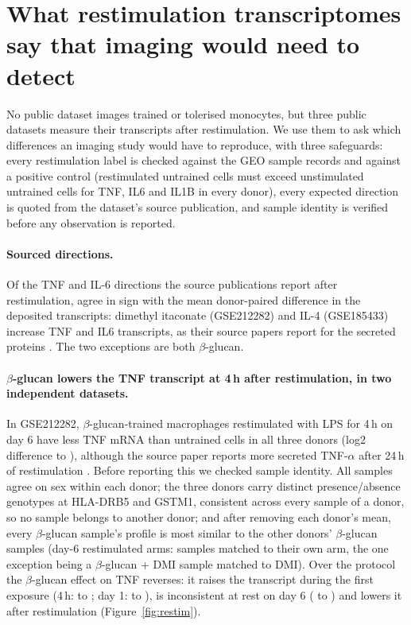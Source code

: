 \section{What restimulation transcriptomes say that imaging would need to detect}
\label{sec:partC}
No public dataset images trained or tolerised monocytes, but three public datasets measure
their transcripts after restimulation. We use them to ask which differences an imaging
study would have to reproduce, with three safeguards: every restimulation label is checked
against the GEO sample records and against a positive control (restimulated untrained
cells must exceed unstimulated untrained cells for TNF, IL6 and IL1B in every donor), every
expected direction is quoted from the dataset's source publication, and sample identity is
verified before any observation is reported.

\paragraph{Sourced directions.} Of the  TNF and IL-6 directions the
source publications report after restimulation,  agree in sign with the
mean donor-paired difference in the deposited transcripts: dimethyl itaconate (GSE212282) and IL-4 (GSE185433)
increase TNF and IL6 transcripts, as their source papers report for the secreted proteins
\citep{ferreira2023,schrijver2023}. The two exceptions are both $\beta$-glucan.

\paragraph{$\beta$-glucan lowers the TNF transcript at 4\,h after restimulation, in two
independent datasets.} In GSE212282, $\beta$-glucan-trained macrophages restimulated with LPS
for 4\,h on day 6 have less TNF mRNA than untrained cells in all three donors (log2
difference  to ), although the source paper
reports more secreted TNF-$\alpha$ after 24\,h of restimulation
\citep{ferreira2023}. Before reporting this we checked sample identity. All
 samples agree on sex within each donor; the three donors carry distinct
presence/absence genotypes at HLA-DRB5 and GSTM1, consistent across every sample of a donor,
so no sample belongs to another donor; and after removing each donor's mean, every
$\beta$-glucan sample's profile is most similar to the other donors' $\beta$-glucan samples
(day-6 restimulated arms:  samples matched to their own arm, the one
exception being a $\beta$-glucan + DMI sample matched to DMI). Over the protocol the
$\beta$-glucan effect on TNF reverses: it raises the transcript during the first exposure
(4\,h:  to ; day 1:  to
), is inconsistent at rest on day 6 ( to
) and lowers it after restimulation (Figure~\ref{fig:restim}).

